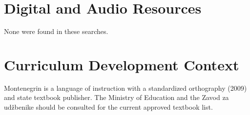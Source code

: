 \documentclass[12pt]{article}
\begin{document}
\section{Digital and Audio Resources}
None were found in these searches.

\section{Curriculum Development Context}
Montenegrin is a language of instruction with a standardized orthography (2009) and state textbook publisher. The Ministry of Education and the Zavod za udžbenike should be consulted for the current approved textbook list.
\end{document}
